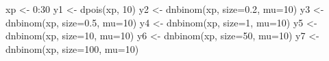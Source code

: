 \documentclass[
  13,
  letterpaper,
]{report}
\newenvironment{Shaded}{\begin{snugshade}}{\end{snugshade}}
\newcommand{\AttributeTok}[1]{\textcolor[rgb]{0.40,0.45,0.13}{#1}}
\newcommand{\DecValTok}[1]{\textcolor[rgb]{0.68,0.00,0.00}{#1}}
\newcommand{\FloatTok}[1]{\textcolor[rgb]{0.68,0.00,0.00}{#1}}
\newcommand{\FunctionTok}[1]{\textcolor[rgb]{0.28,0.35,0.67}{#1}}
\newcommand{\NormalTok}[1]{\textcolor[rgb]{0.00,0.23,0.31}{#1}}
\newcommand{\OtherTok}[1]{\textcolor[rgb]{0.00,0.23,0.31}{#1}}
\newcommand{\SpecialCharTok}[1]{\textcolor[rgb]{0.37,0.37,0.37}{#1}}
\begin{document}
\begin{Shaded}
\begin{Highlighting}[]
\NormalTok{xp }\OtherTok{\textless{}{-}} \DecValTok{0}\SpecialCharTok{:}\DecValTok{30}
\NormalTok{y1 }\OtherTok{\textless{}{-}} \FunctionTok{dpois}\NormalTok{(xp, }\DecValTok{10}\NormalTok{)}
\NormalTok{y2 }\OtherTok{\textless{}{-}} \FunctionTok{dnbinom}\NormalTok{(xp, }\AttributeTok{size=}\FloatTok{0.2}\NormalTok{, }\AttributeTok{mu=}\DecValTok{10}\NormalTok{)}
\NormalTok{y3 }\OtherTok{\textless{}{-}} \FunctionTok{dnbinom}\NormalTok{(xp, }\AttributeTok{size=}\FloatTok{0.5}\NormalTok{, }\AttributeTok{mu=}\DecValTok{10}\NormalTok{)}
\NormalTok{y4 }\OtherTok{\textless{}{-}} \FunctionTok{dnbinom}\NormalTok{(xp, }\AttributeTok{size=}\DecValTok{1}\NormalTok{, }\AttributeTok{mu=}\DecValTok{10}\NormalTok{)}
\NormalTok{y5 }\OtherTok{\textless{}{-}} \FunctionTok{dnbinom}\NormalTok{(xp, }\AttributeTok{size=}\DecValTok{10}\NormalTok{, }\AttributeTok{mu=}\DecValTok{10}\NormalTok{)}
\NormalTok{y6 }\OtherTok{\textless{}{-}} \FunctionTok{dnbinom}\NormalTok{(xp, }\AttributeTok{size=}\DecValTok{50}\NormalTok{, }\AttributeTok{mu=}\DecValTok{10}\NormalTok{)}
\NormalTok{y7 }\OtherTok{\textless{}{-}} \FunctionTok{dnbinom}\NormalTok{(xp, }\AttributeTok{size=}\DecValTok{100}\NormalTok{, }\AttributeTok{mu=}\DecValTok{10}\NormalTok{)}


\end{Highlighting}
\end{Shaded}
\end{document}
